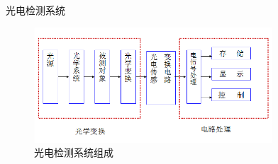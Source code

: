 \documentclass[10pt]{beamer}
\begin{document}
\begin{frame}{光电检测系统}
    \begin{figure}[htbp] 
    \centering\includegraphics[width=3.5in]{source/intro_oe1.png} 
    \caption{光电检测系统组成}\label{fig:1} 
    \end{figure} 

\end{frame}
\end{document}
